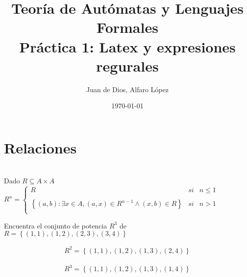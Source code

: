 \documentclass[fleqn, 10pt]{article}
\title{Teoría de Autómatas y Lenguajes Formales\\[.4\baselineskip]Práctica 1: Latex y expresiones regurales}
\author{Juan de Dios, Alfaro López}
\date{\today}
\theoremstyle{plain}
\theoremstyle{definition}
\begin{document}
\maketitle

\section{Relaciones}

\\
Dado $R \subseteq A \times A$ 
\\

$
R^n= \left\{ \begin{array}{lcc}
             R &   si  & n \leq 1 \\
             \\ \left\lbrace\left(a,b\right) : \exists x \in A ,\left(a,x\right)\in R^{n-1}\land\left(x,b\right)\in R\right\rbrace&  si & n > 1 \\
             \end{array}
   \right.
$


\example
Encuentra el conjunto de potencia $R^3$ de $R = \left\lbrace\left(1,1\right),\left(1,2\right),\left(2,3\right),\left(3,4\right)\right\rbrace$

\begin{ceqn}	%
    \begin{align*} %
    R^2 = \left\lbrace\left(1,1\right),\left(1,2\right),\left(1,3\right),\left(2,4\right)\right\rbrace
    \end{align*} 
  \end{ceqn} 
  
  \begin{ceqn}	%
    \begin{align*} %
    R^3 = \left\lbrace\left(1,1\right),\left(1,2\right),\left(1,3\right),\left(1,4\right)\right\rbrace
    \end{align*} 
  \end{ceqn} 
\end{document}
